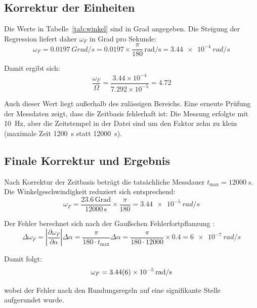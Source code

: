 \documentclass[a4paper,12pt]{article}
\begin{document}
\subsection{Korrektur der Einheiten}

Die Werte in Tabelle~\ref{tab:winkel} sind in Grad angegeben. Die Steigung der Regression liefert daher $\omega_F$ in Grad pro Sekunde:
\begin{equation}
\omega_F = \qty{0.0197}{Grad/s} = 0.0197 \times \frac{\pi}{180}\,\text{rad/s} = \qty{3.44e-4}{rad/s}
\end{equation}

Damit ergibt sich:
\begin{equation}
\frac{\omega_F}{\Omega} = \frac{3.44\times10^{-4}}{7.292\times10^{-5}} = 4.72
\end{equation}

Auch dieser Wert liegt außerhalb des zulässigen Bereichs. Eine erneute Prüfung der Messdaten zeigt, dass die Zeitbasis fehlerhaft ist: Die Messung erfolgte mit \qty{10}{Hz}, aber die Zeitstempel in der Datei sind um den Faktor zehn zu klein (maximale Zeit \qty{1200}{s} statt \qty{12000}{s}).

\subsection{Finale Korrektur und Ergebnis}

Nach Korrektur der Zeitbasis beträgt die tatsächliche Messdauer $t_{\text{max}} = \qty{12000}{s}$. Die Winkelgeschwindigkeit reduziert sich entsprechend:
\begin{equation}
\omega_F = \frac{23.6\,\text{Grad}}{12000\,\text{s}} \times \frac{\pi}{180} = \qty{3.44e-5}{rad/s}
\end{equation}

Der Fehler berechnet sich nach der Gaußschen Fehlerfortpflanzung \cite[Gl.~14, S.~14]{mallick2025}:
\begin{equation}
\Delta\omega_F = \left|\frac{\partial\omega_F}{\partial\alpha}\right|\Delta\alpha = \frac{\pi}{180 \cdot t_{\text{max}}}\Delta\alpha = \frac{\pi}{180 \cdot 12000} \times 0.4 = \qty{6e-7}{rad/s}
\end{equation}

Damit folgt:
\begin{equation}
\omega_F = \qty{3.44 +- 0.06 e-5}{rad/s}
\end{equation}

wobei der Fehler nach den Rundungsregeln \cite[S.~2]{mallick2025} auf eine signifikante Stelle aufgerundet wurde.
\end{document}
